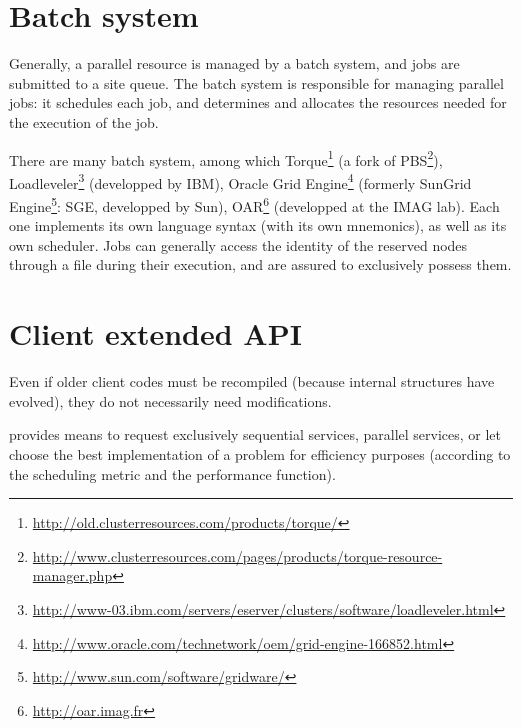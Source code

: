 \section{Batch system}

Generally, a parallel resource is managed by a batch system, and jobs are
submitted to a site queue. The batch system is responsible for managing
parallel jobs: it schedules each job, and determines and allocates the
resources needed for the execution of the job. 

There are many batch system, among which
Torque\footnote{\url{http://old.clusterresources.com/products/torque/}} (a fork
of
PBS\footnote{\url{http://www.clusterresources.com/pages/products/torque-resource-manager.php}}),
Loadleveler\footnote{\url{http://www-03.ibm.com/servers/eserver/clusters/software/loadleveler.html}}
(developped by IBM), Oracle Grid
Engine\footnote{\url{http://www.oracle.com/technetwork/oem/grid-engine-166852.html}}
(formerly SunGrid Engine\footnote{\url{http://www.sun.com/software/gridware/}}:
SGE, developped by Sun), OAR\footnote{\url{http://oar.imag.fr}} (developped at
the IMAG lab). Each one implements its own language syntax (with its own
mnemonics), as well as its own scheduler. Jobs can generally access the
identity of the reserved nodes through a file during their execution, and are
assured to exclusively possess them.

\section{Client extended API}

Even if older client codes must be recompiled (because internal
structures have evolved), they do not necessarily need modifications.

\diet provides means to request exclusively sequential services,
parallel services, or let \diet choose the best implementation of a
problem for efficiency purposes (according to the scheduling metric
and the performance function).

